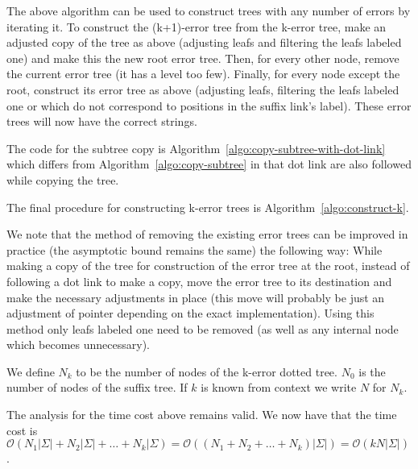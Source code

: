 

The above algorithm can be used to construct trees with any number of errors by iterating it. To construct the (k+1)-error tree from the k-error tree, make an adjusted copy of the tree as above (adjusting leafs and filtering the leafs labeled one) and make this the new root error tree. Then, for every other node, remove the current error tree (it has a level too few). Finally, for every node except the root, construct its error tree as above (adjusting leafs, filtering the leafs labeled one or which do not correspond to positions in the suffix link's label). These error trees will now have the correct strings.



The code for the subtree copy is Algorithm~\ref{algo:copy-subtree-with-dot-link} which differs from Algorithm~\ref{algo:copy-subtree} in that dot link are also followed while copying the tree.

The final procedure for constructing k-error trees is Algorithm~\ref{algo:construct-k}.

We note that the method of removing the existing error trees can be improved in practice (the asymptotic bound remains the same) the following way: While making a copy of the tree for construction of the error tree at the root, instead of following a dot link to make a copy, move the error tree to its destination and make the necessary adjustments in place (this move will probably be just an adjustment of pointer depending on the exact implementation). Using this method only leafs labeled one need to be removed (as well as any internal node which becomes unnecessary).

\begin{definition}
We define $N_k$ to be the number of nodes of the k-error dotted tree. $N_0$ is the number of nodes of the suffix tree. If $k$ is known from context we write $N$ for $N_k$.
\end{definition}

The analysis for the time cost above remains valid. We now have that the time cost is $\mathcal{O}(N_1|\Sigma|+N_2|\Sigma|+\dots+N_k|\Sigma)=\mathcal{O}((N_1+N_2+\dots+N_k)|\Sigma|)=\mathcal{O}(kN|\Sigma|)$.

